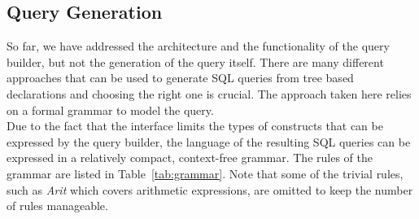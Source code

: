 \documentclass[11pt,a4paper]{globis-book}
\begin{document}
\subsection{Query Generation}
So far, we have addressed the architecture and the functionality of the query builder, but not the generation of the query itself. There are many different approaches that can be used to generate SQL queries from tree based declarations and choosing the right one is crucial. The approach taken here relies on a formal grammar to model the query.\\
Due to the fact that the interface limits the types of constructs that can be expressed by the query builder, the language of the resulting SQL queries can be expressed in a relatively compact, context-free grammar. The rules of the grammar are listed in Table~\ref{tab:grammar}. Note that some of the trivial rules, such as \textit{Arit} which covers arithmetic expressions, are omitted to keep the number of rules manageable.
\end{document}
